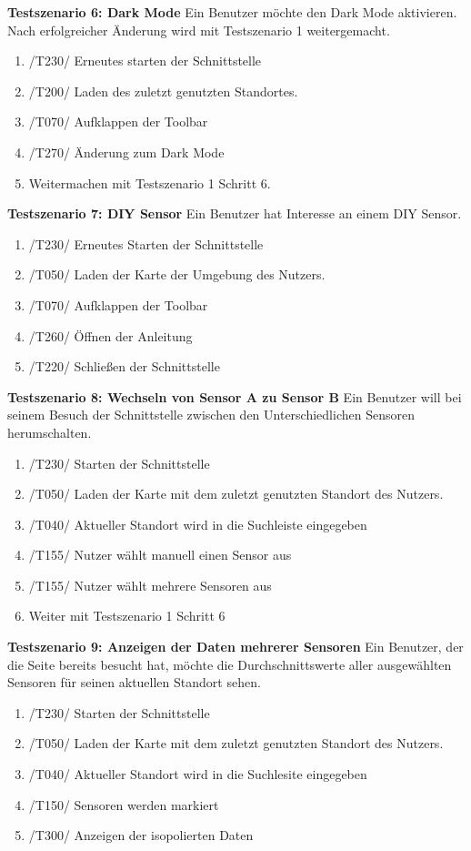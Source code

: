 \textbf{Testszenario 6: Dark Mode}
\newline
Ein Benutzer möchte den Dark Mode aktivieren. Nach erfolgreicher Änderung wird mit Testszenario 1 weitergemacht.
\begin{enumerate} [noitemsep]
    \item /T230/ Erneutes starten der Schnittstelle
    \item /T200/ Laden des zuletzt genutzten Standortes.
    \item /T070/ Aufklappen der Toolbar
    \item /T270/ Änderung zum Dark Mode
    \item Weitermachen mit Testszenario 1 Schritt 6.
\end{enumerate}

\textbf{Testszenario 7: DIY Sensor}
\newline
Ein Benutzer hat Interesse an einem DIY Sensor.
\begin{enumerate} [noitemsep]
    \item /T230/ Erneutes Starten der Schnittstelle
    \item /T050/ Laden der Karte der Umgebung des Nutzers.
    \item /T070/ Aufklappen der Toolbar
    \item /T260/ Öffnen der Anleitung
    \item /T220/ Schließen der Schnittstelle
\end{enumerate}

\textbf{Testszenario 8: Wechseln von Sensor A zu Sensor B}
\newline
Ein Benutzer will bei seinem Besuch der Schnittstelle zwischen den Unterschiedlichen Sensoren herumschalten. 
\begin{enumerate} [noitemsep]
    \item /T230/ Starten der Schnittstelle
    \item /T050/ Laden der Karte mit dem zuletzt genutzten Standort des Nutzers.
    \item /T040/ Aktueller Standort wird in die Suchleiste eingegeben
    \item /T155/ Nutzer wählt manuell einen Sensor aus 
    \item /T155/ Nutzer wählt mehrere Sensoren aus
    \item Weiter mit Testszenario 1 Schritt 6
\end{enumerate}

\textbf{Testszenario 9: Anzeigen der Daten mehrerer Sensoren}
\newline
Ein Benutzer, der die Seite bereits besucht hat, möchte die Durchschnittswerte aller ausgewählten Sensoren für seinen aktuellen Standort sehen.
\begin{enumerate} [noitemsep]
    \item /T230/ Starten der Schnittstelle
    \item /T050/ Laden der Karte mit dem zuletzt genutzten Standort des Nutzers.
    \item /T040/ Aktueller Standort wird in die Suchlesite eingegeben
    \item /T150/ Sensoren werden markiert
    \item /T300/ Anzeigen der isopolierten Daten
\end{enumerate}